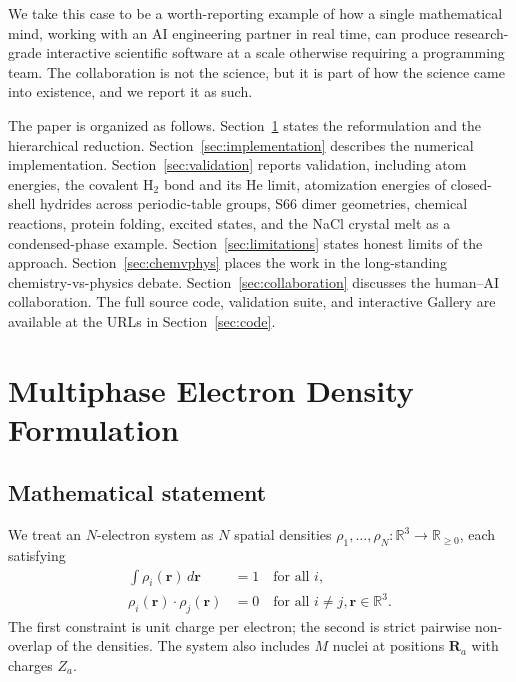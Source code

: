 \documentclass[11pt]{article}
\begin{document}
We take this case to be a worth-reporting example of how a single mathematical mind, working with an AI engineering partner in real time, can produce research-grade interactive scientific software at a scale otherwise requiring a programming team. The collaboration is not the science, but it is part of how the science came into existence, and we report it as such.

The paper is organized as follows. Section~\ref{sec:reformulation} states the reformulation and the hierarchical reduction. Section~\ref{sec:implementation} describes the numerical implementation. Section~\ref{sec:validation} reports validation, including atom energies, the covalent H$_2$ bond and its He limit, atomization energies of closed-shell hydrides across periodic-table groups, S66 dimer geometries, chemical reactions, protein folding, excited states, and the NaCl crystal melt as a condensed-phase example. Section~\ref{sec:limitations} states honest limits of the approach. Section~\ref{sec:chemvphys} places the work in the long-standing chemistry-vs-physics debate. Section~\ref{sec:collaboration} discusses the human--AI collaboration. The full source code, validation suite, and interactive Gallery are available at the URLs in Section~\ref{sec:code}.

\section{Multiphase Electron Density Formulation}\label{sec:reformulation}

\subsection{Mathematical statement}

We treat an $N$-electron system as $N$ spatial densities $\rho_1, \ldots, \rho_N : \mathbb{R}^3 \to \mathbb{R}_{\geq 0}$, each satisfying
\begin{align}
\int \rho_i(\mathbf{r})\, d\mathbf{r} &= 1 \quad \text{for all } i, \\
\rho_i(\mathbf{r}) \cdot \rho_j(\mathbf{r}) &= 0 \quad \text{for all } i \neq j, \mathbf{r} \in \mathbb{R}^3.
\end{align}
The first constraint is unit charge per electron; the second is strict pairwise non-overlap of the densities. The system also includes $M$ nuclei at positions $\mathbf{R}_a$ with charges $Z_a$.
\end{document}
